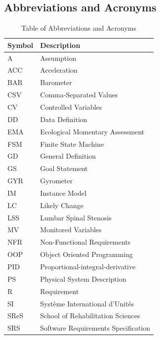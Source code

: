 \documentclass[12pt, titlepage]{article}
\begin{document}
\subsection{Abbreviations and Acronyms}

\renewcommand{\arraystretch}{1.2}
\begin{table}[H]
	\noindent\begin{tabular}{l l} 
	  \toprule		
	  \textbf{Symbol} & \textbf{Description}\\
	  \midrule 
	  A & Assumption\\
	  ACC & Acceleration\\
	  BAR & Barometer\\
	  CSV & Comma-Separated Values\\
	  CV & Controlled Variables\\
	  DD & Data Definition\\
	  EMA & Ecological Momentary Assessment\\
	  FSM & Finite State Machine\\
	  GD & General Definition\\
	  GS & Goal Statement\\
	  GYR & Gyrometer\\
	  IM & Instance Model\\
	  LC & Likely Change\\
	  LSS & Lumbar Spinal Stenosis\\
	  MV & Monitored Variables\\
	  NFR & Non-Functional Requirements\\
	  OOP & Object Oriented Programming\\
	  PID & Proportional-integral-derivative\\
	  PS & Physical System Description\\
	  R & Requirement\\
	  SI & Syst\`{e}me International d'Unit\'{e}s\\
	  SReS & School of Rehabilitation Sciences\\
	  SRS & Software Requirements Specification\\
	
	  \bottomrule
	\end{tabular}\\
	\caption{\label{abbacr}Table of Abbreviations and Acronyms}  
\end{table}

\newpage

\tableofcontents

\listoftables %
\end{document}
